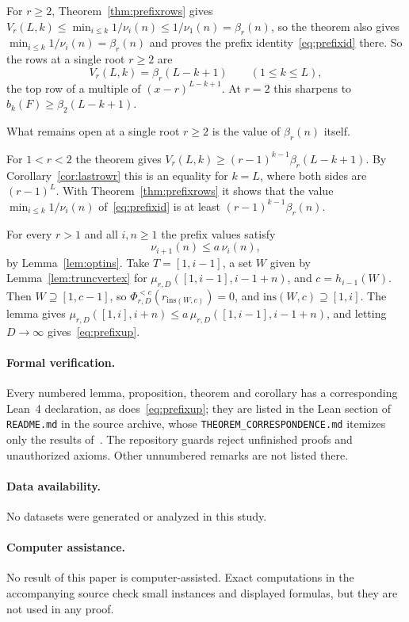 \documentclass[11pt]{article}
\begin{document}
For $r\ge2$, Theorem~\ref{thm:prefixrows} gives
$V_r(L,k)\le\min_{i\le k}1/\nu_i(n)\le1/\nu_1(n)=\beta_r(n)$, so the theorem
also gives $\min_{i\le k}1/\nu_i(n)=\beta_r(n)$ and proves the prefix
identity~\eqref{eq:prefixid} there.  So the rows at a single
root $r\ge2$ are
\[
  V_r(L,k)=\beta_r(L-k+1)\qquad(1\le k\le L),
\]
the top row of a multiple of $(x-r)^{L-k+1}$.  At $r=2$ this sharpens
\cite[Theorem~5.9]{coefficient-mass} to $b_k(F)\ge\beta_2(L-k+1)$.

What remains open at a single root $r\ge2$ is the value of $\beta_r(n)$
itself.

For $1<r<2$ the theorem gives $V_r(L,k)\ge(r-1)^{k-1}\beta_r(L-k+1)$.  By
Corollary~\ref{cor:lastrowr} this is an equality for $k=L$, where both sides
are $(r-1)^L$.  With Theorem~\ref{thm:prefixrows} it shows that the
value $\min_{i\le k}1/\nu_i(n)$ of~\eqref{eq:prefixid} is at least
$(r-1)^{k-1}\beta_r(n)$.

For every $r>1$ and all $i,n\ge1$ the prefix values satisfy
\begin{equation}\label{eq:prefixup}
  \nu_{i+1}(n)\le a\,\nu_i(n),
\end{equation}
by Lemma~\ref{lem:optins}.  Take
$T=[1,i-1]$, a set $W$ given by Lemma~\ref{lem:truncvertex} for
$\mu_{r,D}([1,i-1],i-1+n)$, and $c=h_{i-1}(W)$.  Then $W\supseteq[1,c-1]$,
so $\Phi_{r,D}^{<c}(r_{\mathrm{ins}(W,c)})=0$, and
$\mathrm{ins}(W,c)\supseteq[1,i]$.  The lemma gives
$\mu_{r,D}([1,i],i+n)\le a\,\mu_{r,D}([1,i-1],i-1+n)$, and letting
$D\to\infty$ gives~\eqref{eq:prefixup}.


\paragraph{Formal verification.}
Every numbered lemma, proposition, theorem and corollary has a
corresponding Lean~4 declaration, as does~\eqref{eq:prefixup}; they are
listed in the Lean section of \texttt{README.md} in the source archive,
whose \texttt{THEOREM\_CORRESPONDENCE.md} itemizes only the results
of~\cite{coefficient-mass}.  The repository guards reject unfinished
proofs and unauthorized axioms.  Other unnumbered remarks are not listed
there.

\paragraph{Data availability.}
No datasets were generated or analyzed in this study.

\paragraph{Computer assistance.}
No result of this paper is computer-assisted.  Exact computations in the
accompanying source check small instances and displayed formulas, but they
are not used in any proof.
\end{document}
